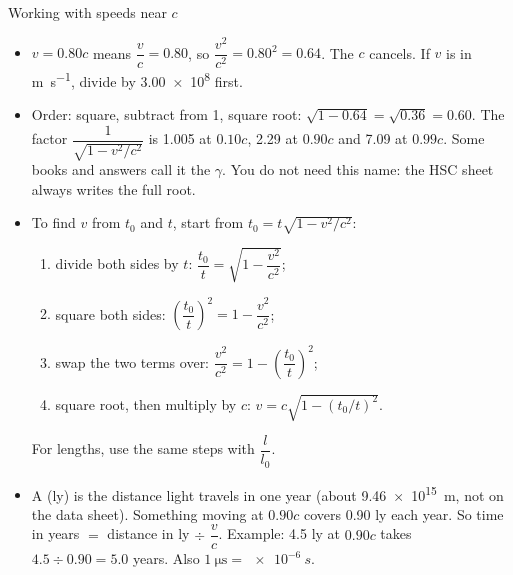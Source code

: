 \begin{toolkit}[breakable]{Working with speeds near $c$}
\begin{itemize}
  \item $v = 0.80c$ means $\dfrac{v}{c} = 0.80$, so $\dfrac{v^2}{c^2} = 0.80^2 = 0.64$. The $c$
        cancels. If $v$ is in \si{m.s^{-1}}, divide by \num{3.00e8} first.
  \item Order: square, subtract from 1, square root: $\sqrt{1 - 0.64} = \sqrt{0.36} = 0.60$.
        The factor $\dfrac{1}{\sqrt{1 - v^2/c^2}}$ is 1.005 at $0.10c$, 2.29 at $0.90c$ and
        7.09 at $0.99c$. Some books and answers call it the  $\gamma$. You
        do not need this name: the HSC sheet always writes the full root.
  \item To find $v$ from $t_0$ and $t$, start from $t_0 = t\sqrt{1 - v^2/c^2}$:
        \begin{enumerate}
          \item divide both sides by $t$: $\dfrac{t_0}{t} = \sqrt{1 - \dfrac{v^2}{c^2}}$;
          \item square both sides: $\left(\dfrac{t_0}{t}\right)^2 = 1 - \dfrac{v^2}{c^2}$;
          \item swap the two terms over: $\dfrac{v^2}{c^2} = 1 - \left(\dfrac{t_0}{t}\right)^2$;
          \item square root, then multiply by $c$: $v = c\sqrt{1 - (t_0/t)^2}$.
        \end{enumerate}
        For lengths, use the same steps with $\dfrac{l}{l_0}$.
  \item A  (ly) is the distance light travels in one year (about
        \qty{9.46e15}{m}, not on the data sheet). Something moving at $0.90c$ covers 0.90 ly
        each year. So time in years $=$ distance in ly $\div$ $\dfrac{v}{c}$. Example: 4.5 ly
        at $0.90c$ takes $4.5 \div 0.90 = 5.0$ years. Also $\qty{1}{\micro\second} = \qty{e-6}{s}$.
\end{itemize}
\end{toolkit}

